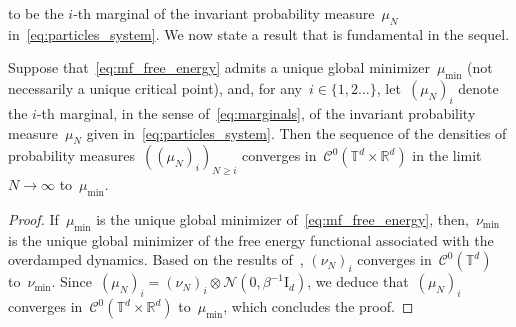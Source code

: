 \documentclass[onefignum,onetabnum]{siamart251216} %
\newcommand{\norm}[1]{\left\lVert#1\right\rVert}
\newcommand{\torus}{\mathbb T}
\newcommand{\real}{\mathbb R}
\newcommand{\mc}[1]{\mathcal{#1}}
\renewcommand{\leq}{\leqslant}
\renewcommand{\geq}{\geqslant}
\newcommand{\mescin}{\mu}
\newcommand{\mespos}{\nu}
\theoremstyle{plain}
\numberwithin{equation}{section}
\numberwithin{theorem}{section}
\begin{document}
to be the $i$-th marginal of the invariant probability measure~$\mescin_N$ in~\eqref{eq:particles_system}. %
We now state a result that is fundamental in the sequel.
\begin{proposition}
    \label{prop:weak_limit_marginals}
    Suppose that~\eqref{eq:mf_free_energy} admits a unique global minimizer~$\mescin_{\min}$ (not necessarily a unique critical point),
    and, for any~$i \in \{1, 2\dotsc\}$, let~$(\mescin_N)_i$ denote the $i$-th marginal, in the sense of~\eqref{eq:marginals}, of the invariant probability measure~$\mescin_N$ given in~\eqref{eq:particles_system}.
    Then the sequence of the densities of probability measures~$((\mescin_N)_i)_{N\geq i}$ converges in~$\mc{C}^0(\torus^d \times \real ^d)$ in the limit~$N \to \infty$ to~$\mescin_{\min}$.
\end{proposition}
\begin{proof}
    If~$\mescin_{\min}$ is the unique global minimizer of~\eqref{eq:mf_free_energy}, then,~$\mespos_{\min}$ is the unique global minimizer of the free energy functional associated with the overdamped dynamics. Based on the results of~\cite[Section 3]{delgadino2021diffusive}, $(\mespos_N)_i$ converges in~$\mc{C}^0(\torus^d)$ to~$\mespos_{\min}$. Since~$(\mescin_N)_i= (\mespos_N)_i \otimes \mc{N}(0,\beta^{-1}\text{I}_d)$, we deduce that~$(\mescin_N)_i$ converges in~$\mc{C}^0(\torus^d \times \real ^d)$ to~$\mescin_{\min}$, which concludes the proof.
\end{proof}
%
%
\end{document}
